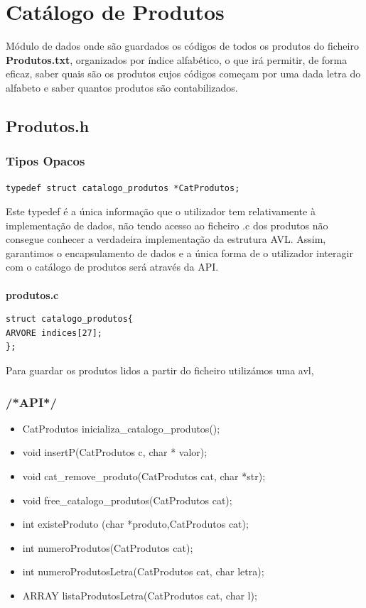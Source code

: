 \section{Catálogo de Produtos}

 Módulo de dados onde são guardados os códigos de todos os produtos do ficheiro \textbf{Produtos.txt}, organizados por índice alfabético, o que irá permitir, de forma eficaz, saber quais são os produtos cujos códigos começam por uma dada letra do alfabeto e saber quantos produtos são contabilizados. 


\subsection{Produtos.h}

\subsubsection{Tipos Opacos}
\begin{verbatim}
typedef struct catalogo_produtos *CatProdutos;
\end{verbatim}

Este typedef é a única informação que o utilizador tem relativamente à implementação de dados, não tendo acesso ao ficheiro .c dos produtos não consegue conhecer a verdadeira implementação da estrutura AVL. Assim, garantimos o encapsulamento de dados e a única forma de o utilizador interagir com o catálogo de produtos será através da API. 

\paragraph{}
\textbf{produtos.c}

\begin{verbatim}
struct catalogo_produtos{
ARVORE indices[27];
};
\end{verbatim}

 Para guardar os produtos lidos a partir do ficheiro utilizámos uma avl,

\subsubsection{/*API*/}

\begin{itemize}
	
\item CatProdutos inicializa\_catalogo\_produtos();
\item void insertP(CatProdutos c, char * valor);
\item void cat\_remove\_produto(CatProdutos cat, char *str);
\item void free\_catalogo\_produtos(CatProdutos cat);
\item int existeProduto (char *produto,CatProdutos cat);
\item int numeroProdutos(CatProdutos cat);
\item int numeroProdutosLetra(CatProdutos cat, char letra);
\item ARRAY listaProdutosLetra(CatProdutos cat, char l);
\end{itemize}


